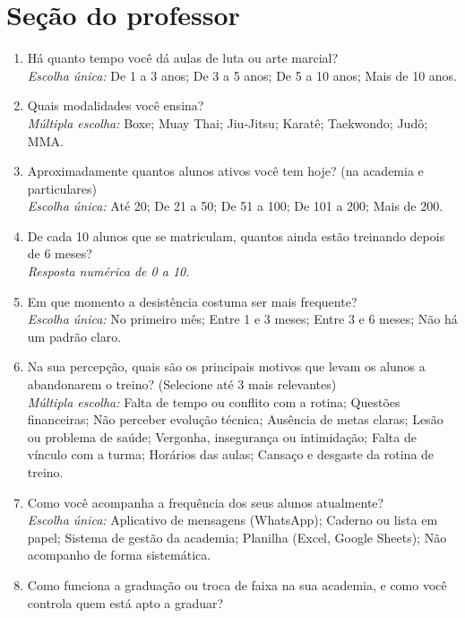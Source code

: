 \section*{Seção do professor}
\begin{enumerate}[leftmargin=*, itemsep=1pt, parsep=0pt]
  \item Há quanto tempo você dá aulas de luta ou arte marcial?\\
        {\footnotesize\textit{Escolha única:} De 1 a 3 anos; De 3 a 5 anos; De 5 a 10 anos; Mais de 10 anos.}
  \item Quais modalidades você ensina?\\
        {\footnotesize\textit{Múltipla escolha:} Boxe; Muay Thai; Jiu-Jitsu; Karatê; Taekwondo; Judô; MMA.}
  \item Aproximadamente quantos alunos ativos você tem hoje? (na academia e particulares)\\
        {\footnotesize\textit{Escolha única:} Até 20; De 21 a 50; De 51 a 100; De 101 a 200; Mais de 200.}
  \item De cada 10 alunos que se matriculam, quantos ainda estão treinando depois de 6 meses?\\
        {\footnotesize\textit{Resposta numérica de 0 a 10.}}
  \item Em que momento a desistência costuma ser mais frequente?\\
        {\footnotesize\textit{Escolha única:} No primeiro mês; Entre 1 e 3 meses; Entre 3 e 6 meses; Não há um padrão claro.}
  \item Na sua percepção, quais são os principais motivos que levam os alunos a abandonarem o treino? (Selecione até 3 mais relevantes)\\
        {\footnotesize\textit{Múltipla escolha:} Falta de tempo ou conflito com a rotina; Questões financeiras; Não perceber evolução técnica; Ausência de metas claras; Lesão ou problema de saúde; Vergonha, insegurança ou intimidação; Falta de vínculo com a turma; Horários das aulas; Cansaço e desgaste da rotina de treino.}
  \item Como você acompanha a frequência dos seus alunos atualmente?\\
        {\footnotesize\textit{Escolha única:} Aplicativo de mensagens (WhatsApp); Caderno ou lista em papel; Sistema de gestão da academia; Planilha (Excel, Google Sheets); Não acompanho de forma sistemática.}
  \item Como funciona a graduação ou troca de faixa na sua academia, e como você controla quem está apto a graduar?\\

\end{enumerate}
